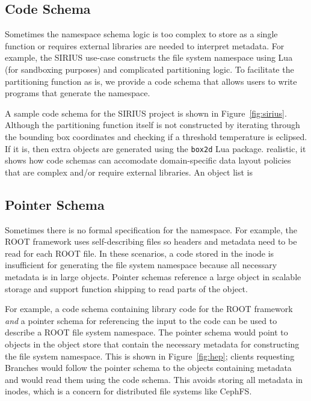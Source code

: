 
\subsection{Code Schema}

Sometimes the namespace schema logic is too complex to store as a single
function or requires external libraries are needed to interpret metadata. For
example, the SIRIUS use-case constructs the file system namespace using Lua
(for sandboxing purposes) and complicated partitioning logic. To facilitate the
partitioning function as is, we provide a code schema that allows users to
write programs that generate the namespace.

A sample code schema for the SIRIUS project is shown in
Figure~\ref{fig:sirius}.  Although the partitioning function itself is not
constructed by iterating through the bounding box coordinates and checking if a
threshold temperature is eclipsed. If it is, then extra objects are generated
using the \texttt{box2d} Lua package.  realistic, it shows how code schemas can
accomodate domain-specific data layout policies that are complex and/or require
external libraries.  An object list is

\subsection{Pointer Schema} 

Sometimes there is no formal specification for the namespace. For example, the
ROOT framework uses self-describing files so headers and metadata need to be
read for each ROOT file. In these scenarios, a code stored in the inode is
insufficient for generating the file system namespace because all necessary
metadata is in large objects. Pointer schemas reference a large object in
scalable storage and support function shipping to read parts of the object.

For example, a code schema containing library code for the ROOT framework
\emph{and} a pointer schema for referencing the input to the code can be used
to describe a ROOT file system namespace. The pointer schema would point to
objects in the object store that contain the necessary metadata for
constructing the file system namespace. This is shown in Figure~\ref{fig:hep};
clients requesting Branches would follow the pointer schema to the objects
containing metadata and would read them using the code schema. This avoids
storing all metadata in inodes, which is a concern for distributed file systems
like CephFS.

